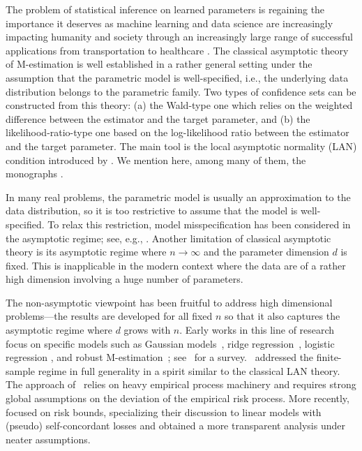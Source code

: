 The problem of statistical inference on learned parameters is regaining the importance it deserves
as machine learning and data science are increasingly impacting humanity and society through an increasingly large range of successful applications from transportation to healthcare \citep[see, e.g.,][]{fan2020statistical,efron2021computer}.
The classical asymptotic theory of M-estimation is well established in a rather general setting under the assumption that the parametric model is well-specified, i.e., the underlying data distribution belongs to the parametric family.
Two types of confidence sets can be constructed from this theory: (a) the Wald-type one which relies on the weighted difference between the estimator and the target parameter, and (b) the likelihood-ratio-type one based on the log-likelihood ratio between the estimator and the target parameter.
The main tool is the local asymptotic normality (LAN) condition introduced by \citet{lecam1960locally}.
We mention here, among many of them, the monographs \citep{ibragimov1981statistical,van2000asymptotic,geer2000empirical}.

In many real problems, the parametric model is usually an approximation to the data distribution, so it is too restrictive to assume that the model is well-specified.
To relax this restriction, model misspecification has been considered in the asymptotic regime; see, e.g., \citep{huber1967under,wakefield2013bayesian,dawid2016scoring}.
Another limitation of classical asymptotic theory is its asymptotic regime where $n \rightarrow \infty$ and the parameter dimension $d$ is fixed.
This is inapplicable in the modern context where the data are of a rather high dimension involving a huge number of parameters.

The non-asymptotic viewpoint has been fruitful to address high dimensional problems---the results are developed for all fixed $n$ so that it also captures the asymptotic regime where $d$ grows with $n$.
Early works in this line of research focus on specific models such as Gaussian models~\citep{beran1996confidence,beran1998modulation,laurent2000adaptive,baraud2004confidence}, ridge regression~\citep{hsu2012random}, logistic regression \citep{bach2010self}, and robust M-estimation~\citep{zhou2018huber,chen2020robust}; see~\citet{bach2021learning} for a survey.~\citet{spokoiny2012parametric} addressed the finite-sample regime in full generality in a spirit similar to the classical LAN theory.
The approach of~\cite{spokoiny2012parametric} relies on heavy empirical process machinery and requires strong global assumptions on the deviation of the empirical risk process. More recently,~\citet{ostrovskii2021finite} focused on risk bounds, specializing their discussion to linear models with (pseudo) self-concordant losses and obtained a more transparent analysis under neater assumptions.


